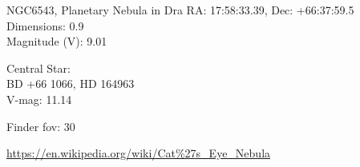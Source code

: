 \begin{block}{NGC6543, Planetary Nebula in Dra}
    RA: 17:58:33.39, Dec: +66:37:59.5 \\ 
    Dimensions: 0.9 \\ 
    Magnitude (V): 9.01


    Central Star: \\ 
      \hspace{1em}BD +66 1066, HD 164963 \\ 
      \hspace{1em}V-mag: 11.14 


    Finder fov: 30 

    \url{https://en.wikipedia.org/wiki/Cat%27s_Eye_Nebula} 
\end{block}